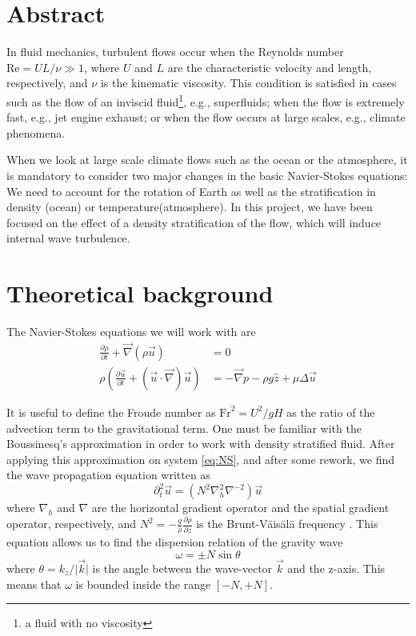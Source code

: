 \documentclass[11pt,twocolumn]{article}
\newcommand{\pd}[2]{\frac{\partial #1}{\partial #2}}
\begin{document}
\section*{Abstract}

In fluid mechanics, turbulent flows occur when the Reynolds number $\mathrm{Re} = UL/\nu \gg 1$, where $U$ and $L$ are the characteristic velocity and length, respectively, and $\nu$ is the kinematic viscosity. This condition is satisfied in cases such as the flow of an inviscid fluid\footnote{a fluid with no viscosity}, e.g., superfluids; when the flow is extremely fast, e.g., jet engine exhaust; or when the flow occurs at large scales, e.g., climate phenomena. 

When we look at large scale climate flows such as the ocean or the atmosphere, it is mandatory to consider two major changes in the basic Navier-Stokes equations: We need to account for the rotation of Earth as well as the stratification in density (ocean) or temperature(atmosphere). In this project, we have been focused on the effect of a density stratification of the flow, which will induce internal wave turbulence.

\section{Theoretical background}

The Navier-Stokes equations we will work with are 
\begin{subequations}
\begin{align}
	\pd{\rho}{t} + \vec{\nabla} \left( \rho \vec{u} \right) &= 0 \\
	\rho \left( \pd{\vec{u}}{t} + \left( \vec{u} \cdot \vec{\nabla} \right) \vec{u} \right) &= - \vec{\nabla} p - \rho g \hat{z} + \mu \Delta \vec{u}
\end{align}
\label{eq:NS}
\end{subequations}

It is useful to define the Froude number as $\mathrm{Fr}^2 = U^2/gH$ as the ratio of the advection term to the gravitational term. One must be familiar with the Boussinesq's approximation \cite{boussinesq_theorie_1897} in order to work with density stratified fluid. After applying this approximation on system \ref{eq:NS}, and after some rework, we find the wave propagation equation written as 
\begin{equation}
	\partial^2_t \vec{u} = \left( N^2 \nabla^2_h \nabla^{-2} \right) \vec{u} \label{eq:Wave Propagation}
\end{equation}
where $\nabla_h$ and $\nabla$ are the horizontal gradient operator and the spatial gradient operator, respectively, and $N^2 = -\frac{g}{\rho} \pd{\rho}{z}$ is the Brunt-Väisälä frequency \cite{pedlosky_geophysical_1979}. This equation allows us to find the dispersion relation of the gravity wave 
\begin{equation}
	\omega = \pm N \sin{\theta} \label{eq:Dispersion relation}
\end{equation}
where $\theta = k_z/\lvert \vec{k} \rvert$ is the angle between the wave-vector $\vec{k}$ and the z-axis. This means that $\omega$ is bounded inside the range $\left[ -N, +N \right]$. 
\end{document}
